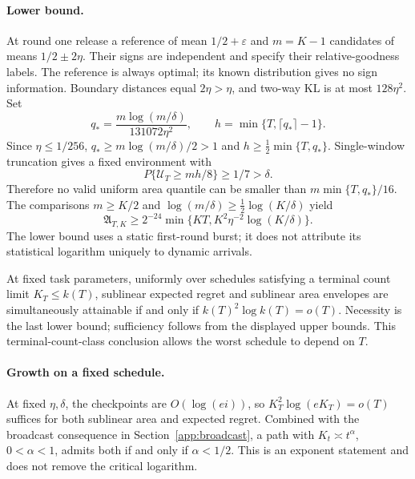 \documentclass[11pt]{article}
\theoremstyle{remark}
\begin{document}
\paragraph{Lower bound.}
At round one release a reference of mean $1/2+\varepsilon$ and
$m=K-1$ candidates of means $1/2\pm2\eta$. Their signs are independent and
specify their relative-goodness labels. The reference is always optimal;
its known distribution gives no sign information. Boundary distances equal
$2\eta>\eta$, and two-way KL is at most $128\eta^2$. Set
\[
 q_* =\frac{m\log(m/\delta)}{131072\eta^2},\qquad
 h=\min\{T,\lceil q_*\rceil-1\}.
\]
Since $\eta\le1/256$, $q_*\ge m\log(m/\delta)/2>1$ and
$h\ge\frac12\min\{T,q_*\}$. Single-window truncation gives a fixed
environment with
\[
 P\{\mathcal U_T\ge mh/8\}\ge1/7>\delta.
\]
Therefore no valid uniform area quantile can be smaller than
$m\min\{T,q_*\}/16$. The comparisons
$m\ge K/2$ and $\log(m/\delta)\ge\frac12\log(K/\delta)$ yield
\[
 \mathfrak A_{T,K}\ge
 2^{-24}\min\{KT,K^2\eta^{-2}\log(K/\delta)\}.
\]
The lower bound uses a static first-round burst; it does not attribute its
statistical logarithm uniquely to dynamic arrivals.

At fixed task parameters, uniformly over schedules satisfying a terminal
count limit $K_T\le k(T)$, sublinear expected regret and sublinear area
envelopes are simultaneously attainable if and only if
$k(T)^2\log k(T)=o(T)$. Necessity is the last lower bound; sufficiency follows
from the displayed upper bounds. This terminal-count-class conclusion
allows the worst schedule to depend on $T$.

\paragraph{Growth on a fixed schedule.}
At fixed $\eta,\delta$, the checkpoints are $O(\log(ei))$, so
$K_T^2\log(eK_T)=o(T)$ suffices for both sublinear area and expected regret.
Combined with the broadcast consequence in Section~\ref{app:broadcast}, a path with
$K_t\asymp t^\alpha$, $0<\alpha<1$, admits both if and only if $\alpha<1/2$.
This is an exponent statement and does not remove the critical logarithm.
\end{document}
